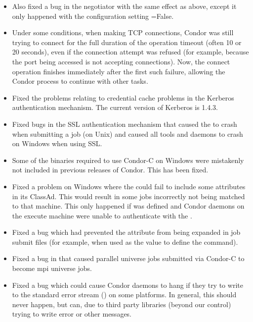 \begin{itemize}
\item Also fixed a bug in the negotiator with the same effect as
above, except it only happened with the configuration setting
=False.

\item Under some conditions, when making TCP connections, Condor was
still trying to connect for the full duration of the operation timeout
(often 10 or 20 seconds), even if the connection attempt was refused
(for example, because the port being accessed is not accepting connections).
Now, the connect operation finishes immediately after the first such
failure, allowing the Condor process to continue with other tasks.

\item Fixed the problems relating to credential cache problems in the Kerberos
authentication mechanism.  The current version of Kerberos is 1.4.3.

\item Fixed bugs in the SSL authentication mechanism that caused the
 to crash when submitting a job (on Unix) and caused
all tools and daemons to crash on Windows when using SSL.

\item Some of the binaries required to use Condor-C on Windows were
mistakenly not included in previous releases of Condor. This has been
fixed.

\item Fixed a problem on Windows where the  could fail to
include some attributes in its ClassAd. This would result in some jobs
incorrectly not being matched to that machine.  This only happened if
 was defined and Condor daemons on the execute
machine were unable to authenticate with the .

\item Fixed a  bug which had prevented the
 attribute from being expanded in job submit files
(for example,
when used as the value to define the  command).

\item Fixed a bug in  that caused parallel universe jobs
submitted via Condor-C to become mpi universe jobs.

\item Fixed a bug which could cause Condor daemons to hang if they try
to write to the standard error stream () on some platforms.  In
general, this should never happen, but can, due to third party
libraries (beyond our control) trying to write error or other messages.


\end{itemize}
